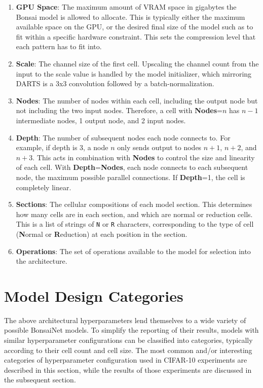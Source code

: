 \begin{enumerate}
	\item \textbf{GPU Space}: The maximum amount of VRAM space in gigabytes the Bonsai model is allowed to allocate. This
	is typically either the maximum available space on the GPU, or the desired final size of the model such as
	to fit within a specific hardware constraint. This sets the compression level that each pattern has to fit into.
	\item \textbf{Scale}: The channel size of the first cell. Upscaling the channel count from the input to the scale
	value is handled by the model initializer, which mirroring DARTS is a 3x3 convolution followed by a batch-normalization.
	\item \textbf{Nodes}: The number of nodes within each cell, including the output node but not including the two input nodes.
	Therefore, a cell with \textbf{Nodes}=$n$ has $n-1$ intermediate nodes, 1 output node, and 2 input nodes.
	\item \textbf{Depth}: The number of subsequent nodes each node connects to. For example, if depth is 3, a node $n$
	only sends output to nodes $n+1$, $n+2$, and $n+3$. This acts in combination with \textbf{Nodes} to control the
	size and linearity of each cell. With \textbf{Depth}=\textbf{Nodes}, each node connects to each subsequent node, the maximum
	possible parallel connections. If \textbf{Depth}=1, the cell is completely linear.
	\item \textbf{Sections}: The cellular compositions of each model section. This determines how many cells are in each
	section, and which are normal or reduction cells. This is a
	list of strings of \texttt{N} or \texttt{R} characters, corresponding to the type of cell (\textbf{N}ormal or \textbf{R}eduction) at each position in the section.
	\item \textbf{Operations}: The set of operations available to the model for selection into the architecture.
\end{enumerate}

\section{Model Design Categories}
The above architectural hyperparameters lend themselves to a wide variety of possible BonsaiNet models. To simplify the
reporting of their results, models with similar hyperparameter configurations can be classified into categories,
typically according to their cell count and cell size. The most common and/or interesting categories of
hyperparameter configuration used in CIFAR-10 experiments are described in this section, while the results of
those experiments are discussed in the subsequent section.

